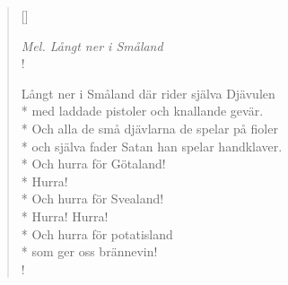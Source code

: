 \settowidth{\versewidth}{Långt ner i Småland där rider själva Djävulen}


\begin{verse}[\versewidth]

\flagverse{}
\emph{Mel. Långt ner i Småland}\\!

Långt ner i Småland där rider själva Djävulen\\*
med laddade pistoler och knallande gevär.\\*
Och alla de små djävlarna de spelar på fioler\\*
och själva fader Satan han spelar handklaver.\\*
Och hurra för Götaland!\\*
Hurra!\\*
Och hurra för Svealand!\\*
Hurra! Hurra!\\*
Och hurra för potatisland\\*
som ger oss brännevin!\\!


\end{verse}

